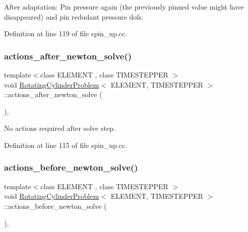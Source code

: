 After adaptation\+: Pin pressure again (the previously pinned value might have disappeared) and pin redudant pressure dofs. 



Definition at line 119 of file spin\+\_\+up.\+cc.

\mbox{\label{classRotatingCylinderProblem_a2cac6acd0607a98fd1b5f2c155335dbd}} 
\subsubsection{\texorpdfstring{actions\+\_\+after\+\_\+newton\+\_\+solve()}{actions\_after\_newton\_solve()}}
{\footnotesize\ttfamily template$<$class E\+L\+E\+M\+E\+NT , class T\+I\+M\+E\+S\+T\+E\+P\+P\+ER $>$ \\
void \hyperlink{classRotatingCylinderProblem}{Rotating\+Cylinder\+Problem}$<$ E\+L\+E\+M\+E\+NT, T\+I\+M\+E\+S\+T\+E\+P\+P\+ER $>$\+::actions\+\_\+after\+\_\+newton\+\_\+solve (\begin{DoxyParamCaption}{ }\end{DoxyParamCaption})\hspace{0.3cm}{\ttfamily [inline]}, {\ttfamily [private]}}



No actions required after solve step. 



Definition at line 115 of file spin\+\_\+up.\+cc.

\mbox{\label{classRotatingCylinderProblem_af6678f4329624865484d52058d8902a3}} 
\subsubsection{\texorpdfstring{actions\+\_\+before\+\_\+newton\+\_\+solve()}{actions\_before\_newton\_solve()}}
{\footnotesize\ttfamily template$<$class E\+L\+E\+M\+E\+NT , class T\+I\+M\+E\+S\+T\+E\+P\+P\+ER $>$ \\
void \hyperlink{classRotatingCylinderProblem}{Rotating\+Cylinder\+Problem}$<$ E\+L\+E\+M\+E\+NT, T\+I\+M\+E\+S\+T\+E\+P\+P\+ER $>$\+::actions\+\_\+before\+\_\+newton\+\_\+solve (\begin{DoxyParamCaption}{ }\end{DoxyParamCaption})\hspace{0.3cm}{\ttfamily [inline]}, {\ttfamily [private]}}



